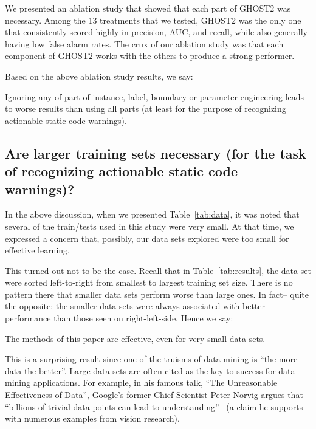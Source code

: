 We presented an ablation study that showed that each part of GHOST2 was necessary. Among the 13 treatments that we tested, GHOST2 was the only one that consistently scored highly in precision, AUC, and recall, while also generally having low false alarm rates. The crux of our ablation study was that each component of GHOST2 works with the others to produce a strong performer.
 
 Based on the above ablation study results, we say:
 \begin{formal}
 Ignoring any of
part of
instance,  label,  boundary  or parameter engineering leads to worse results than
using all parts (at least for the purpose of recognizing actionable static code
warnings).
\end{formal}



 \subsection*{
  Are larger training sets necessary (for the task of recognizing actionable static code warnings)?}
 
 In the above discussion, when we presented
Table~\ref{tab:data}, it was noted that several
of the train/tests used in this study were very small. At that time, we expressed a concern that, possibly, our   data sets explored   were too small for effective learning. 


This turned out not to be the case.
Recall that in 
  Table~\ref{tab:results},
  the data set were sorted left-to-right from smallest to largest training set size. There is no pattern there  that smaller data sets perform worse than large ones.  In fact-- quite the opposite: the smaller data sets were always associated with better performance than those seen on right-left-side.  Hence we say:
  
  
  \begin{formal}
 The methods of this paper are effective,
even for very small data sets.
\end{formal}


This is a surprising result since one of the truisms of data mining is ``the more data the better''. 
 Large data sets  are often cited as the key to success for data
mining applications. For example, in his famous talk, ``The
Unreasonable Effectiveness of Data'',
Google’s former Chief Scientist
Peter Norvig argues that ``billions of trivial data points can
lead to understanding''~\cite{norvig11} (a claim he supports with numerous
examples from vision research).



